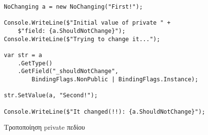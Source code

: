 \begin{listing}[htbp]
\begin{verbatim}
NoChanging a = new NoChanging("First!");

Console.WriteLine($"Initial value of private " +  
    $"field: {a.ShouldNotChange}");
Console.WriteLine($"Trying to change it...");

var str = a
    .GetType()
    .GetField("_shouldNotChange", 
        BindingFlags.NonPublic | BindingFlags.Instance);

str.SetValue(a, "Second!");

Console.WriteLine($"It changed(!!): {a.ShouldNotChange}");
\end{verbatim}
\caption{Τροποποίηση private πεδίου}
\label{reflectionChangePrivate}
\end{listing}